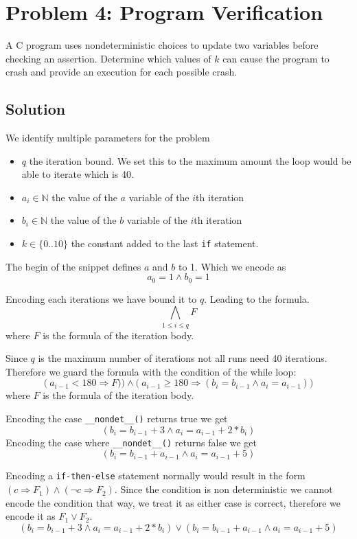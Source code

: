 \section{Problem 4: Program Verification}
A C program uses nondeterministic choices to update two variables before checking an assertion.
Determine which values of $k$ can cause the program to crash and provide an execution for each possible crash.

\subsection{Solution}
We identify multiple parameters for the problem
\begin{itemize}
\item $q$ the iteration bound. We set this to the maximum amount the loop would be able to iterate which is 40.
\item $a_i \in \mathbb{N}$ the value of the $a$ variable of the $i$th iteration
\item $b_i \in \mathbb{N}$ the value of the $b$ variable of the $i$th iteration
\item $k \in \{0..10\}$ the constant added to the last \verb|if| statement.
\end{itemize}

The begin of the snippet defines $a$ and $b$ to 1. Which we encode as 
\[
a_0 = 1 \wedge b_0 = 1
\]

Encoding each iterations we have bound it to $q$. Leading to the formula.
\begin{equation} \label{eq:e4-2}
\bigwedge_{1 \le i \le q} F
\end{equation}
where $F$ is the formula of the iteration body.

Since $q$ is the maximum number of iterations not all runs need 40 iterations. Therefore we guard the formula with the condition of the while loop:
\begin{equation}
\big( \  a_{i-1} < 180 \Rightarrow F) \big) \wedge 
\big( \ a_{i-1} \geq 180 \Rightarrow ( b_i = b_{i-1} \wedge a_i = a_{i-1} )\big)
\end{equation}
where $F$ is the formula of the iteration body.

Encoding the case \verb|__nondet__()| returns true we get
\[
(b_i = b_{i-1} + 3 \wedge a_i = a_{i-1} + 2 * b_i )
\]
Encoding the case where \verb|__nondet__()| returns false we get
\[
(b_i = b_{i-1} + a_{i-1} \wedge a_i = a_{i-1} + 5 )
\]

Encoding a \verb|if-then-else| statement normally would result in the form $(c \Rightarrow F_1) \wedge (\neg c \Rightarrow F_2)$.
Since the condition is non deterministic we cannot encode the condition that way, we treat it as either case is correct, therefore we encode it as $F_1 \vee F_2$.
\begin{equation} \label{eq:e4-1}
(b_i = b_{i-1} + 3 \wedge a_i = a_{i-1} + 2 * b_i ) \vee
(b_i = b_{i-1} + a_{i-1} \wedge a_i = a_{i-1} + 5 )
\end{equation}


